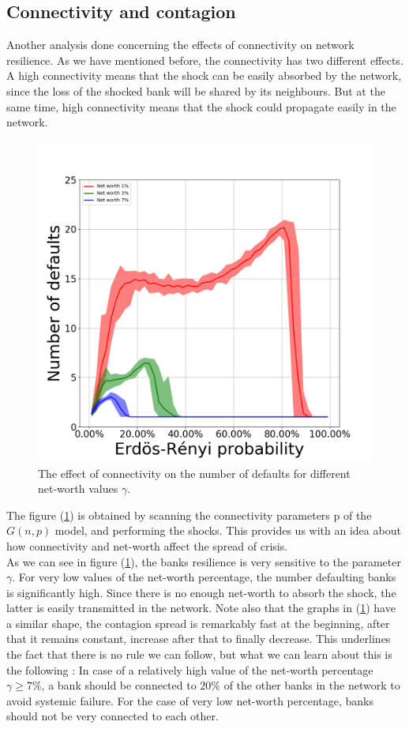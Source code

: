\documentclass[14pt]{article}
\providecommand{\reff}[1]{(\ref{#1})}
\begin{document}
\subsection{Connectivity and contagion}
Another analysis done concerning the effects of connectivity on network resilience. As we have mentioned before, the connectivity has two different effects. A high connectivity means that the shock can be easily absorbed by the network, since the loss of the shocked bank will be shared by its neighbours. But at the same time, high connectivity means that the shock could propagate easily in the network.

\begin{figure}[h]
    \centering
  \includegraphics[width=0.6\linewidth]{img/fig4.png}
  \caption{The effect of connectivity on the number of defaults for different net-worth values $\gamma$.}
  \label{fig:4}
\end{figure}

The figure \reff{fig:4} is obtained by scanning the connectivity parameters p of the $G(n,p)$ model, and performing the shocks. 
This provides us with an idea about how connectivity and net-worth affect the spread of crisis. 
\\As we can see in figure \reff{fig:4}, the banks resilience is very sensitive to the parameter $\gamma$. For very low values of the net-worth percentage, the number defaulting banks is significantly high. Since there is no enough net-worth to absorb the shock, the latter is easily transmitted in the network. Note also that the graphs in \reff{fig:4} have a similar shape, the contagion spread is remarkably fast at the beginning, after that it remains constant, increase after that to finally decrease. This underlines the fact that there is no  rule we can follow, but what we can learn about this is the following : In case of a relatively high value of the net-worth percentage $\gamma \geq 7 \%$, a bank should be connected to $20\%$ of the other banks in the network to avoid systemic failure. For the case of very low net-worth percentage, banks should not be very connected to each other.
\end{document}
